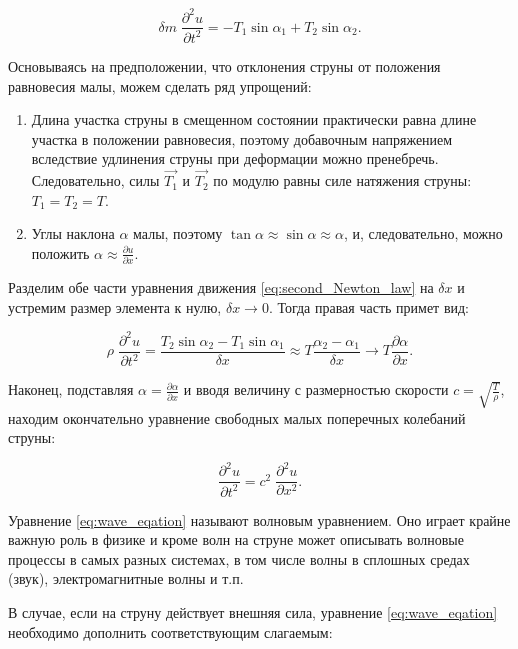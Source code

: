 \documentclass[12pt,a4paper,russian]{report}
\begin{document}
	\begin{equation} \label{eq:second_Newton_law}
		\delta m \; \frac{\partial^2 u}{\partial t^2} = - T_1 \sin \alpha_1 + T_2 \sin \alpha_2.
	\end{equation}
	
	Основываясь на предположении, что отклонения струны от положения равновесия малы, можем сделать ряд упрощений:
	
	\begin{enumerate}
		\item Длина участка струны в смещенном состоянии практически равна длине участка в положении равновесия, поэтому добавочным напряжением вследствие удлинения струны при деформации можно пренебречь. Следовательно, силы $\overrightarrow{T_1}$ и $\overrightarrow{T_2}$ по модулю равны силе натяжения струны: $T_1 = T_2 = T$.
		\item Углы наклона $\alpha$ малы, поэтому $\tan \alpha \approx \sin \alpha \approx \alpha$, и, следовательно, можно положить $\alpha \approx \frac{\partial u}{\partial x}$.
	\end{enumerate}
	
	Разделим обе части уравнения движения \eqref{eq:second_Newton_law} на $\delta x$ и устремим размер элемента к нулю, $\delta x \rightarrow 0$. Тогда правая часть примет вид:
	
	\begin{equation*}
		\rho \; \frac{\partial^2 u}{\partial t^2} = \frac{T_2 \sin \alpha_2 - T_1 \sin \alpha_1}{\delta x} \approx T \frac{\alpha_2 - \alpha_1}{\delta x} \rightarrow T \frac{\partial \alpha}{\partial x}.
	\end{equation*}
	
	Наконец, подставляя $\alpha = \frac{\partial \alpha}{\partial x}$ и вводя величину с размерностью скорости $c = \sqrt{\frac{T}{\rho}}$, находим окончательно уравнение свободных малых поперечных колебаний струны:  
	
	\begin{equation} \label{eq:wave_eqation}
		\frac{\partial^2 u}{\partial t^2} = c^2 \; \frac{\partial^2 u}{\partial x^2}.
	\end{equation}

	Уравнение \eqref{eq:wave_eqation} называют волновым уравнением. Оно играет крайне важную роль в физике и кроме волн на струне может описывать волновые процессы в самых разных системах, в том числе волны в сплошных средах (звук), электромагнитные волны и т.п.
	
	В случае, если на струну действует внешняя сила, уравнение \eqref{eq:wave_eqation} необходимо дополнить соответствующим слагаемым:
	
\end{document}
